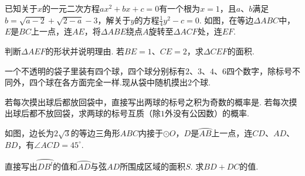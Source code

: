 \documentclass[10pt]{article}
\begin{document}
\begin{questions}{\answeringintroduction}
    \question 已知关于$x$的一元二次方程$ax^2+bx+c=0$有一个根为$x=1$，且$a$、$b$满足$b=\sqrt{a-2}+\sqrt{2-a}-3$，解关于$y$的方程$\frac{1}{4}y^2-c=0$.
    \addemptyline\addemptyline
    \question 如图，在等边$\Delta ABC$中，$E$是$BC$上一点，连$AE$，将$\Delta ABE$绕点$A$旋转至$\Delta ACF$处，连$EF$.
    \begin{subquestions}
        \subquestion 判断$\Delta AEF$的形状并说明理由.
        \subquestion 若$BE=1$、$CE=2$，求$\Delta CEF$的面积.
    \end{subquestions}
    \begin{figure}[!htb]
        \raggedleft
    \end{figure}
    \question 一个不透明的袋子里装有四个球，四个球分别标有$2$、$3$、$4$、$6$四个数字，除标号不同外，四个球在各方面完全一样.现从袋中随机摸出$2$个球.
    \begin{subquestions}
        \subquestion 若每次摸出球后都放回袋中，直接写出两球的标号之积为奇数的概率是\complitingline.
        \subquestion 若每次摸出球后都不放回袋，求两球的标号互质（除$1$外没有公因数）的概率.
    \end{subquestions}
    \newpage
    \question 如图，边长为$2\sqrt{3}$的等边三角形$ABC$内接于$\odot O$，$D$是$\wideparen{AB}$上一点，连$CD$、$AD$、$BD$，有$\angle ACD=45^{\circ}$.
    \begin{subquestions}
        \subquestion 直接写出$\wideparen{{DB}^{l}}$的值和$\wideparen{AD}$与弦$AD$所围成区域的面积$S$.
        \subquestion 求$BD+DC$的值.
    \end{subquestions}
    \begin{figure}[!htb]
        \raggedleft
\end{figure}
\end{questions}
\end{document}
